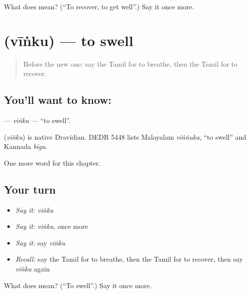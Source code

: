 \begin{tcolorbox}[breakable,colback=teal!4,colframe=teal!35!black,title={Before you move on}]
What does  mean? (\textquotedblleft{}To recover, to get well\textquotedblright{}.) Say it once more.
\end{tcolorbox}
\section[\texorpdfstring{\ta{வீங்கு} (vīṅku)}{வீங்கு (vīṅku)}]{ (vīṅku) — to swell}

\label{lesson:TA-C255-vinku}



\begin{quote}
Before the new one: say the Tamil for to breathe, then the Tamil for to recover.
\end{quote}

\subsection*{You'll want to know: }
\textbf{} — \emph{vīṅku} — \textquotedblleft{}to swell\textquotedblright{}.

\begin{cousinweb}
\textbf{} (\emph{vīṅku}) is native Dravidian. DEDR 5448 lists Malayalam \emph{vīṅṅuka}, \textquotedblleft{}to swell\textquotedblright{} and Kannada \emph{bīgu}.
\end{cousinweb}

\begin{grammarlens}[title={What you've built}]
One more word for this chapter.
\end{grammarlens}

\subsection*{Your turn}
\begin{itemize}
\raggedright
  \item \emph{Say it:} \emph{vīṅku}
  \item \emph{Say it:} \emph{vīṅku}, once more
  \item \emph{Say it:} say \emph{vīṅku}
  \item \emph{Recall:} say the Tamil for to breathe, then the Tamil for to recover, then say \emph{vīṅku} again
\end{itemize}

\begin{tcolorbox}[breakable,colback=teal!4,colframe=teal!35!black,title={Before you move on}]
What does  mean? (\textquotedblleft{}To swell\textquotedblright{}.) Say it once more.
\end{tcolorbox}
